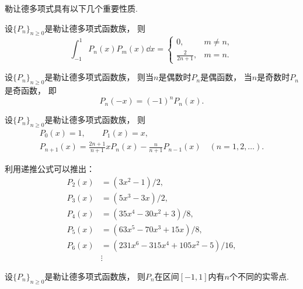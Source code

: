 勒让德多项式具有以下几个重要性质.
\begin{property}
设\(\{P_n\}_{n\geq0}\)是勒让德多项式函数族，
则\begin{equation}
	\int_{-1}^1 P_n(x) P_m(x) \dd{x}
	= \begin{cases}
		0, & m \neq n, \\
		\frac2{2n+1}, & m = n.
	\end{cases}
\end{equation}
\end{property}

\begin{property}
设\(\{P_n\}_{n\geq0}\)是勒让德多项式函数族，
则当\(n\)是偶数时\(P_n\)是偶函数，
当\(n\)是奇数时\(P_n\)是奇函数，
即\begin{equation}
	P_n(-x) = (-1)^n P_n(x).
\end{equation}
\end{property}

\begin{property}
设\(\{P_n\}_{n\geq0}\)是勒让德多项式函数族，
则\begin{gather}
	P_0(x) = 1,
	\qquad
	P_1(x) = x, \\
	P_{n+1}(x)
	= \frac{2n+1}{n+1} x P_n(x)
	- \frac{n}{n+1} P_{n-1}(x)
	\quad(n=1,2,\dotsc).
\end{gather}
\end{property}

利用递推公式可以推出：\begin{align*}
	P_2(x) &= (3x^2-1)/2, \\
	P_3(x) &= (5x^3-3x)/2, \\
	P_4(x) &= (35x^4-30x^2+3)/8, \\
	P_5(x) &= (63x^5-70x^3+15x)/8, \\
	P_6(x) &= (231x^6-315x^4+105x^2-5)/16, \\
	&\vdots
\end{align*}

\begin{property}
设\(\{P_n\}_{n\geq0}\)是勒让德多项式函数族，
则\(P_n\)在区间\([-1,1]\)内有\(n\)个不同的实零点.
\end{property}

